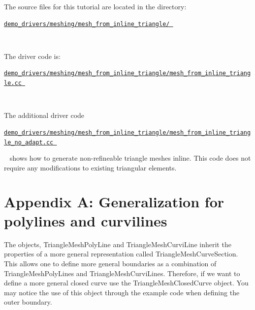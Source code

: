 \begin{DoxyItemize}
\item The source files for this tutorial are located in the directory\+:~\newline
~\newline
\begin{center} \href{../../../../demo_drivers/meshing/mesh_from_triangle/}{\tt demo\+\_\+drivers/meshing/mesh\+\_\+from\+\_\+inline\+\_\+triangle/ } \end{center} ~\newline

\item The driver code is\+: ~\newline
~\newline
\begin{center} \href{../../../../demo_drivers/meshing/mesh_from_inline_triangle/mesh_from_inline_triangle.cc}{\tt demo\+\_\+drivers/meshing/mesh\+\_\+from\+\_\+inline\+\_\+triangle/mesh\+\_\+from\+\_\+inline\+\_\+triangle.\+cc } \end{center}  ~\newline
~\newline

\item The additional driver code ~\newline
~\newline
\begin{center} \href{../../../../demo_drivers/meshing/mesh_from_inline_triangle/mesh_from_inline_triangle_no_adapt.cc}{\tt demo\+\_\+drivers/meshing/mesh\+\_\+from\+\_\+inline\+\_\+triangle/mesh\+\_\+from\+\_\+inline\+\_\+triangle\+\_\+no\+\_\+adapt.\+cc } \end{center}  ~\newline
shows how to generate non-\/refineable triangle meshes inline. This code does not require any modifications to existing triangular elements.
\end{DoxyItemize}\hypertarget{index_curve_sections}{}\section{Appendix A\+: Generalization for polylines and curvilines}\label{index_curve_sections}
The objects, {\ttfamily Triangle\+Mesh\+Poly\+Line} and {\ttfamily Triangle\+Mesh\+Curvi\+Line} inherit the properties of a more general representation called {\ttfamily Triangle\+Mesh\+Curve\+Section}. This allows one to define more general boundaries as a combination of {\ttfamily Triangle\+Mesh\+Poly\+Lines} and {\ttfamily Triangle\+Mesh\+Curvi\+Lines}. Therefore, if we want to define a more general closed curve use the {\ttfamily Triangle\+Mesh\+Closed\+Curve} object. You may notice the use of this object through the example code when defining the outer boundary.

